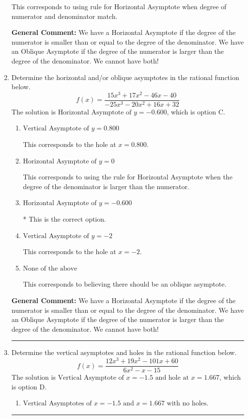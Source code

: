 \documentclass{extbook}[14pt]
\newcommand{\litem}[1]{\item #1

\rule{\textwidth}{0.4pt}}
\begin{document}
\begin{enumerate}
{\begin{enumerate}[label=\Alph*.]
This corresponds to using rule for Horizontal Asymptote when degree of numerator and denominator match.
\end{enumerate}

\textbf{General Comment:} We have a Horizontal Asymptote if the degree of the numerator is smaller than or equal to the degree of the denominator. We have an Oblique Asymptote if the degree of the numerator is larger than the degree of the denominator. We cannot have both!
}
\litem{
Determine the horizontal and/or oblique asymptotes in the rational function below.
\[ f(x) = \frac{15x^{3} +17 x^{2} -46 x -40}{-25x^{3} -20 x^{2} +16 x + 32} \]The solution is \( \text{Horizontal Asymptote of } y = -0.600  \), which is option C.\begin{enumerate}[label=\Alph*.]
\item \( \text{Vertical Asymptote of } y = 0.800  \)

This corresponds to the hole at $x = 0.800$.
\item \( \text{Horizontal Asymptote of } y = 0  \)

This corresponds to using the rule for Horizontal Asymptote when the degree of the denominator is larger than the numerator.
\item \( \text{Horizontal Asymptote of } y = -0.600  \)

* This is the correct option.
\item \( \text{Vertical Asymptote of } y = -2  \)

This corresponds to the hole at $x = -2$.
\item \( \text{None of the above} \)

This corresponds to believing there should be an oblique asymptote.
\end{enumerate}

\textbf{General Comment:} We have a Horizontal Asymptote if the degree of the numerator is smaller than or equal to the degree of the denominator. We have an Oblique Asymptote if the degree of the numerator is larger than the degree of the denominator. We cannot have both!
}
\litem{
Determine the vertical asymptotes and holes in the rational function below.
\[ f(x) = \frac{12x^{3} +19 x^{2} -101 x + 60}{6x^{2} -x -15} \]The solution is \( \text{Vertical Asymptote of } x = -1.5 \text{ and hole at } x = 1.667 \), which is option D.\begin{enumerate}[label=\Alph*.]
\item \( \text{Vertical Asymptotes of } x = -1.5 \text{ and } x = 1.667 \text{ with no holes.} \)


\end{enumerate}}
\end{enumerate}
\end{document}
